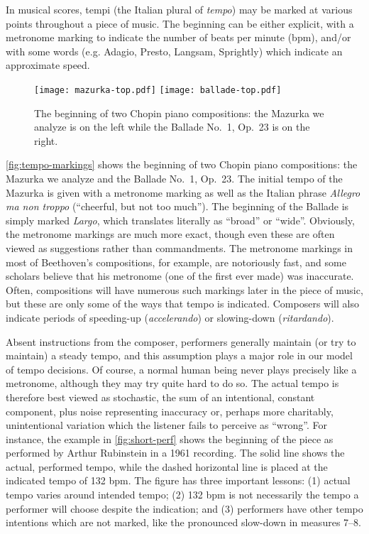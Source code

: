 \documentclass[12pt]{article}
\begin{document}
In musical scores, tempi (the Italian plural of {\em tempo}) may be
marked at various points throughout a piece of music. The
beginning can be either explicit, with a metronome marking to
indicate the number of beats per minute (bpm), and/or with some words
(e.g. Adagio, Presto, Langsam, Sprightly) which indicate an
approximate speed. 
\begin{figure}[t!]
  \centering
  \texttt{[image: mazurka-top.pdf]}
  \texttt{[image: ballade-top.pdf]}
  \caption{The beginning of two Chopin piano compositions: the Mazurka
    we analyze is on the left while the Ballade No.\ 1, Op.\ 23 is on
    the right.}
  \label{fig:tempo-markings}
\end{figure}
\autoref{fig:tempo-markings} shows the beginning of two Chopin piano
compositions: the Mazurka we analyze and the Ballade No.\ 1, Op.\ 23. The initial tempo of the Mazurka is given with a metronome
marking as well as the Italian phrase {\em Allegro ma non troppo}
(``cheerful, but not too much''). The beginning of the Ballade is simply
marked {\em Largo}, which translates literally as ``broad'' or
``wide''. Obviously, the metronome markings are much more exact,
though even these are often viewed as suggestions rather than
commandments. The metronome markings in most of Beethoven's
compositions, for example, are notoriously fast, and some scholars
believe that his metronome (one of the first ever made) was
inaccurate. Often, compositions will have numerous such markings later
in the piece of music, but these are only some of the ways that tempo
is indicated. Composers will also indicate periods of speeding-up
(\emph{accelerando}) or
slowing-down (\emph{ritardando}).

Absent instructions from the composer, performers generally maintain
(or try to maintain) a steady tempo, and this assumption plays a major
role in our model of tempo decisions. Of course, a normal human being
never plays precisely like a 
metronome, although they may try quite hard to do so. The actual
tempo is therefore best viewed as stochastic, the sum of an
intentional, constant component, plus noise representing inaccuracy
or, perhaps more charitably, unintentional variation which the
listener fails to perceive as ``wrong''. For instance, the example in
\autoref{fig:short-perf} shows the beginning of the piece as performed
by Arthur Rubinstein in a 1961 recording. 
The solid line shows the
actual, performed tempo, while the dashed horizontal line is placed at
the indicated tempo of 132 bpm. The figure has three important
lessons: (1) actual tempo varies around intended tempo; (2) 132 bpm is
not necessarily the tempo a performer will choose despite the
indication; and (3) performers have other tempo intentions which are
not marked, like the pronounced slow-down in measures 7--8.
\end{document}
